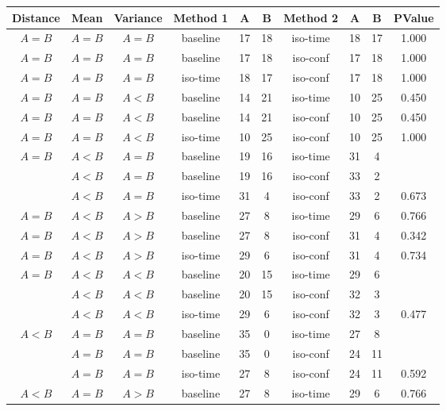 \begin{longtable}{ccc||ccc|ccc||c}
\toprule
 Distance &  Mean &   Variance &  Method 1 &  A &  B &  Method 2 &  A &  B &  PValue \\
\midrule
$A=B$ & $A=B$ & $A=B$ & baseline &   17 &   18 & iso-time &   18 &   17 &   1.000 \\
$A=B$ & $A=B$ & $A=B$ & baseline &   17 &   18 & iso-conf &   17 &   18 &   1.000 \\
$A=B$ & $A=B$ & $A=B$ & iso-time &   18 &   17 & iso-conf &   17 &   18 &   1.000 \\
$A=B$ & $A=B$ & $A<B$ & baseline &   14 &   21 & iso-time &   10 &   25 &   0.450 \\
$A=B$ & $A=B$ & $A<B$ & baseline &   14 &   21 & iso-conf &   10 &   25 &   0.450 \\
$A=B$ & $A=B$ & $A<B$ & iso-time &   10 &   25 & iso-conf &   10 &   25 &   1.000 \\
$A=B$ & $A<B$ & $A=B$ & baseline &   19 &   16 & iso-time &   31 &    4 & \textbf{   0.003 \\}
$A=B$ & $A<B$ & $A=B$ & baseline &   19 &   16 & iso-conf &   33 &    2 & \textbf{   0.000 \\}
$A=B$ & $A<B$ & $A=B$ & iso-time &   31 &    4 & iso-conf &   33 &    2 &   0.673 \\
$A=B$ & $A<B$ & $A>B$ & baseline &   27 &    8 & iso-time &   29 &    6 &   0.766 \\
$A=B$ & $A<B$ & $A>B$ & baseline &   27 &    8 & iso-conf &   31 &    4 &   0.342 \\
$A=B$ & $A<B$ & $A>B$ & iso-time &   29 &    6 & iso-conf &   31 &    4 &   0.734 \\
$A=B$ & $A<B$ & $A<B$ & baseline &   20 &   15 & iso-time &   29 &    6 & \textbf{   0.036 \\}
$A=B$ & $A<B$ & $A<B$ & baseline &   20 &   15 & iso-conf &   32 &    3 & \textbf{   0.002 \\}
$A=B$ & $A<B$ & $A<B$ & iso-time &   29 &    6 & iso-conf &   32 &    3 &   0.477 \\
$A<B$ & $A=B$ & $A=B$ & baseline &   35 &    0 & iso-time &   27 &    8 & \textbf{   0.005 \\}
$A<B$ & $A=B$ & $A=B$ & baseline &   35 &    0 & iso-conf &   24 &   11 & \textbf{   0.000 \\}
$A<B$ & $A=B$ & $A=B$ & iso-time &   27 &    8 & iso-conf &   24 &   11 &   0.592 \\
$A<B$ & $A=B$ & $A>B$ & baseline &   27 &    8 & iso-time &   29 &    6 &   0.766 \\

\end{longtable}
